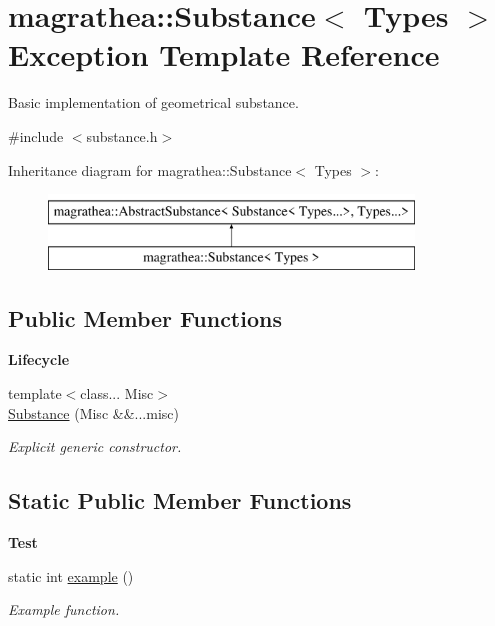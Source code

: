 \hypertarget{exceptionmagrathea_1_1Substance}{\section{magrathea\-:\-:Substance$<$ Types $>$ Exception Template Reference}
\label{exceptionmagrathea_1_1Substance}
}


Basic implementation of geometrical substance.  




{\ttfamily \#include $<$substance.\-h$>$}

Inheritance diagram for magrathea\-:\-:Substance$<$ Types $>$\-:\begin{figure}[H]
\begin{center}
\leavevmode
\includegraphics[height=2.000000cm]{exceptionmagrathea_1_1Substance}
\end{center}
\end{figure}
\subsection*{Public Member Functions}
\begin{Indent}{\bf Lifecycle}\par
\begin{DoxyCompactItemize}
\item 
{\footnotesize template$<$class... Misc$>$ }\\\hyperlink{exceptionmagrathea_1_1Substance_a0130a4da42ee12308959ad06b664d379}{Substance} (Misc \&\&...misc)
\begin{DoxyCompactList}\small\item\em Explicit generic constructor. \end{DoxyCompactList}\end{DoxyCompactItemize}
\end{Indent}
\subsection*{Static Public Member Functions}
\begin{Indent}{\bf Test}\par
\begin{DoxyCompactItemize}
\item 
static int \hyperlink{exceptionmagrathea_1_1Substance_a39e13a647bb62526ddecc9b99c943616}{example} ()
\begin{DoxyCompactList}\small\item\em Example function. \end{DoxyCompactList}\end{DoxyCompactItemize}
\end{Indent}
